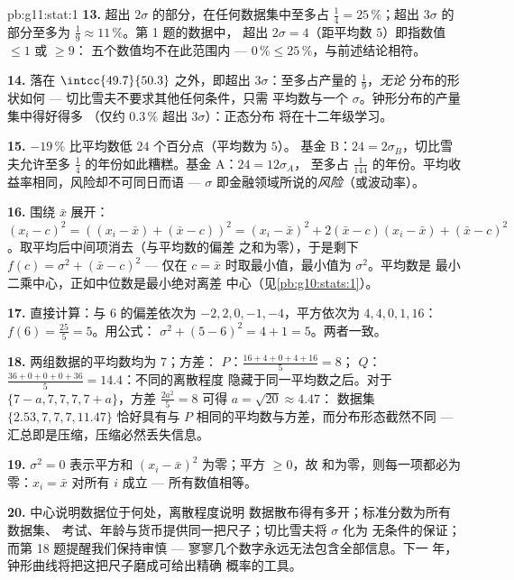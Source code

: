 \begin{solution}{pb:g11:stat:1}
\textbf{13.} 超出 $2\sigma$ 的部分，在任何数据集中至多占
$\frac14 = 25\,\%$；超出 $3\sigma$ 的部分至多为
$\frac19 \approx 11\,\%$。第 1 题的数据中，
超出 $2\sigma = 4$（距平均数 $5$）即指数值 $\leq 1$ 或 $\geq 9$：
五个数值均不在此范围内 --- $0\,\% \leq 25\,\%$，与前述结论相符。

\textbf{14.} 落在 $\intcc{49.7}{50.3}$ 之外，即超出
$3\sigma$：至多占产量的 $\frac19$，\emph{无论}
分布的形状如何 --- 切比雪夫不要求其他任何条件，只需
平均数与一个 $\sigma$。钟形分布的产量集中得好得多
（仅约 $0.3\,\%$ 超出 $3\sigma$）：正态分布
将在十二年级学习。

\textbf{15.} $-19\,\%$ 比平均数低 $24$ 个百分点（平均数为 $5$）。
基金 B：$24 = 2\sigma_B$，切比雪夫允许至多
$\frac14$ 的年份如此糟糕。基金 A：$24 = 12\sigma_A$，
至多占 $\frac{1}{144}$ 的年份。平均收益率相同，风险却不可同日而语 ---
$\sigma$ 即金融领域所说的\emph{风险}（或波动率）。

\textbf{16.} 围绕 $\bar x$ 展开：
$(x_i - c)^2 = \left((x_i - \bar x) + (\bar x - c)\right)^2
= (x_i - \bar x)^2 + 2(\bar x - c)(x_i - \bar x) +
(\bar x - c)^2$。取平均后中间项消去（与平均数的偏差
之和为零），于是剩下
$f(c) = \sigma^2 + (\bar x - c)^2$ --- 仅在
$c = \bar x$ 时取最小值，最小值为 $\sigma^2$。平均数是
最小二乘中心，正如中位数是最小绝对离差
中心（见\cref{pb:g10:stats:1}）。

\textbf{17.} 直接计算：与 $6$ 的偏差依次为
$-2, 2, 0, -1, -4$，平方依次为 $4, 4, 0, 1, 16$：
$f(6) = \frac{25}{5} = 5$。用公式：
$\sigma^2 + (5 - 6)^2 = 4 + 1 = 5$。两者一致。

\textbf{18.} 两组数据的平均数均为 $7$；方差：
$P$：$\frac{16 + 4 + 0 + 4 + 16}{5} = 8$；
$Q$：$\frac{36 + 0 + 0 + 0 + 36}{5} = 14.4$：不同的离散程度
隐藏于同一平均数之后。对于 $\{7 - a, 7, 7, 7, 7 + a\}$，方差
$\frac{2a^2}{5} = 8$ 可得 $a = \sqrt{20} \approx 4.47$：
数据集 $\{2.53, 7, 7, 7, 11.47\}$ 恰好具有与
$P$ 相同的平均数与方差，而分布形态截然不同 ---
汇总即是压缩，压缩必然丢失信息。

\textbf{19.} $\sigma^2 = 0$ 表示平方和
$(x_i - \bar x)^2$ 为零；平方 $\geq 0$，故
和为零，则每一项都必为零：$x_i = \bar x$ 对所有 $i$ 成立
--- 所有数值相等。

\textbf{20.} 中心说明数据位于何处，离散程度说明
数据散布得有多开；标准分数为所有数据集、
考试、年龄与货币提供同一把尺子；切比雪夫将 $\sigma$ 化为
无条件的保证；而第 18 题提醒我们保持审慎
--- 寥寥几个数字永远无法包含全部信息。下一
年，钟形曲线将把这把尺子磨成可给出精确
概率的工具。
\end{solution}
